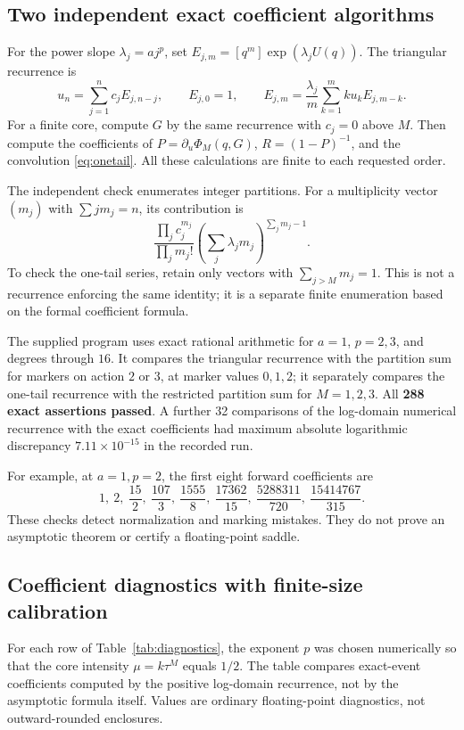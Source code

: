 \documentclass[11pt,a4paper]{article}
\numberwithin{equation}{section}
\theoremstyle{definition}
\theoremstyle{remark}
\begin{document}
\subsection{Two independent exact coefficient algorithms}
For the power slope $\lambda_j=a j^p$, set
$E_{j,m}=[q^m]\exp(\lambda_jU(q))$. The triangular recurrence is
\begin{equation}
 u_n=\sum_{j=1}^{n}c_jE_{j,n-j},\qquad
 E_{j,0}=1,\qquad
 E_{j,m}=\frac{\lambda_j}{m}
       \sum_{k=1}^{m}k u_kE_{j,m-k}.
 \label{eq:recurrence}
\end{equation}
For a finite core, compute $G$ by the same recurrence with $c_j=0$ above
$M$. Then compute the coefficients of
$P=\partial_u\Phi_M(q,G)$, $R=(1-P)^{-1}$, and the convolution
\eqref{eq:onetail}. All these calculations are finite to each requested
order.

The independent check enumerates integer partitions. For a multiplicity
vector $(m_j)$ with $\sum j m_j=n$, its contribution is
\begin{equation}
 \frac{\prod_j c_j^{m_j}}{\prod_jm_j!}
       \left(\sum_j\lambda_jm_j\right)^{\sum_jm_j-1}.
 \label{eq:partition}
\end{equation}
To check the one-tail series, retain only vectors with
$\sum_{j>M}m_j=1$. This is not a recurrence enforcing the same identity;
it is a separate finite enumeration based on the formal coefficient formula.

The supplied program uses exact rational arithmetic for $a=1$, $p=2,3$,
and degrees through $16$. It compares the triangular recurrence with the
partition sum for markers on action $2$ or $3$, at marker values $0,1,2$;
it separately compares the one-tail recurrence with the restricted partition
sum for $M=1,2,3$. All \textbf{288 exact assertions passed}. A further
32 comparisons of the log-domain numerical recurrence with the exact
coefficients had maximum absolute logarithmic discrepancy
$7.11\times10^{-15}$ in the recorded run.

For example, at $a=1,p=2$, the first eight forward coefficients are
\[
 1,\ 2,\ \frac{15}{2},\ \frac{107}{3},\ \frac{1555}{8},\
 \frac{17362}{15},\ \frac{5288311}{720},\ \frac{15414767}{315}.
\]
These checks detect normalization and marking mistakes. They do not prove
an asymptotic theorem or certify a floating-point saddle.

\subsection{Coefficient diagnostics with finite-size calibration}
For each row of Table~\ref{tab:diagnostics}, the exponent $p$ was chosen
numerically so that the core intensity $\mu=k\tau^M$ equals $1/2$.
The table compares exact-event coefficients computed by the positive
log-domain recurrence, not by the asymptotic formula itself. Values are
ordinary floating-point diagnostics, not outward-rounded enclosures.
\end{document}
